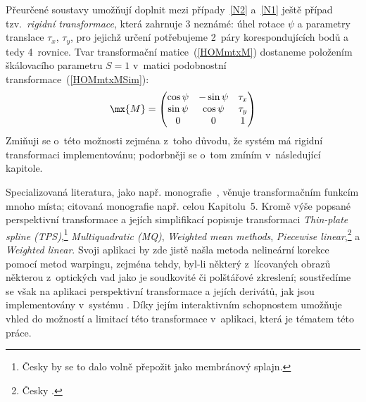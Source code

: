 Přeurčené soustavy umožňují doplnit mezi případy~\ref{N2} a~\ref{N1} ještě
případ tzv.~\emph{rigidní transformace}, která zahrnuje 3 neznámé: úhel rotace
$\psi$ a parametry translace $\tau_{x}$, $\tau_{y}$, pro jejichž určení
potřebujeme 2~páry korespondujících bodů a tedy 4~rovnice. Tvar transformační
matice~(\ref{HOMmtxM}) dostaneme položením škálovacího parametru \mbox{$S=1$}
v~matici podobnostní transformace~(\ref{HOMmtxMSim}):
\begin{equation}                                              \label{HOMmtxMRig}
  \mx{M} =
  \begin{pmatrix}
    \cos\psi & -\sin\psi & \tau_{x}\\
    \sin\psi & \cos\psi & \tau_{y}\\
    0 & 0 & 1
  \end{pmatrix}
\end{equation}
Zmiňuji se o~této možnosti zejména z~toho důvodu, že systém \Mma{} má rigidní
transformaci implementovánu; podorbněji se o~tom zmíním
v~následující kapitole.

Specializovaná literatura, jako
např. monografie~\cite{AGo:2012:ImageReg:2012}, věnuje transformačním
funkcím mnoho místa; citovaná monografie např. celou Kapitolu~5. Kromě výše
popsané perspektivní transformace a jejích simplifikací popisuje transformaci
\emph{Thin-plate spline (TPS)},\footnote{Česky by se to dalo volně přepožit
  jako membránový splajn.} \emph{Multiquadratic (MQ)}, \emph{Weighted mean
  methods}, \emph{Piecewise linear},\footnote{Česky \protect{}.} a \emph{Weighted linear}. Svoji aplikaci by zde jistě našla
metoda nelineární korekce pomocí metod warpingu, zejména tehdy, byl-li některý
z~lícovaných obrazů  některou z~optických vad jako je soudkovité
či polštářové zkreslení; soustředíme se však na aplikaci perspektivní
transformace a jejích derivátů, jak jsou implementovány v~systému \Mma. Díky
jejím interaktivním schopnostem umožňuje vhled do možností a limitací této
transformace v~aplikaci, která je tématem této práce.

\endinput

